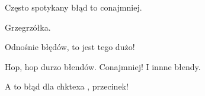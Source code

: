 \documentclass{article}
\begin{document}
Często spotykany błąd to conajmniej. %

Grzegrzółka.

Odnośnie błędów, to jest tego dużo!

Hop, hop durzo błendów. Conajmniej! I innne błendy.

A to błąd dla chktexa , przecinek! %
\end{document}
